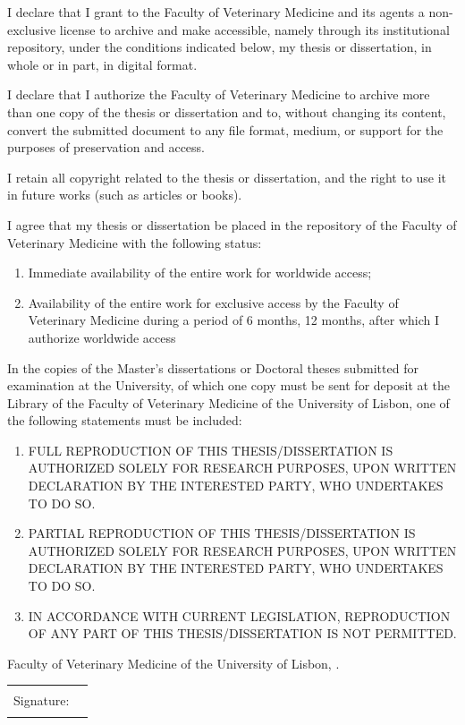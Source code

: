 I declare that I grant to the Faculty of Veterinary Medicine and its agents a non-exclusive license to archive and make accessible, namely through its institutional repository, under the conditions indicated below, my thesis or dissertation, in whole or in part, in digital format.

I declare that I authorize the Faculty of Veterinary Medicine to archive more than one copy of the thesis or dissertation and to, without changing its content, convert the submitted document to any file format, medium, or support for the purposes of preservation and access.

I retain all copyright related to the thesis or dissertation, and the right to use it in future works (such as articles or books).

I agree that my thesis or dissertation be placed in the repository of the Faculty of Veterinary Medicine with the following status:
\begin{enumerate}
  \item {} Immediate availability of the entire work for worldwide access;
  \item {} Availability of the entire work for exclusive access by the Faculty of Veterinary Medicine during a period of  6 months,
 12 months, after which I authorize worldwide access%
\end{enumerate}

{\footnotesize In the copies of the Master's dissertations or Doctoral theses submitted for examination at the University, of which one copy must be sent for deposit at the Library of the Faculty of Veterinary Medicine of the University of Lisbon, one of the following statements must be included:}
\begin{enumerate}
  \item [\checkbox{reproduction}{I}]
        FULL REPRODUCTION OF THIS THESIS/DISSERTATION IS AUTHORIZED SOLELY FOR RESEARCH PURPOSES, 
        UPON WRITTEN DECLARATION BY THE INTERESTED PARTY, WHO UNDERTAKES TO DO SO.
  \item [\checkbox{reproduction}{P}]
        PARTIAL REPRODUCTION OF THIS THESIS/DISSERTATION IS AUTHORIZED SOLELY FOR RESEARCH PURPOSES, 
        UPON WRITTEN DECLARATION BY THE INTERESTED PARTY, WHO UNDERTAKES TO DO SO.
  \item [\checkbox{reproduction}{N}]
        IN ACCORDANCE WITH CURRENT LEGISLATION, REPRODUCTION OF ANY PART OF THIS 
        THESIS/DISSERTATION IS NOT PERMITTED.
\end{enumerate}

Faculty of Veterinary Medicine of the University of Lisbon,
.\par
\bigskip
\begin{tabularx}{\linewidth}{@{}lX@{}}
Signature: & \rule{\linewidth}{0.75pt}
\end{tabularx}
\egroup
